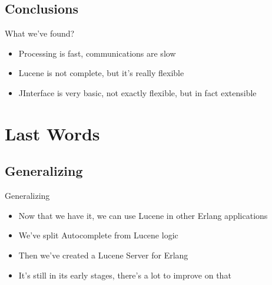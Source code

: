 \documentclass[utf8,hyperref={colorlinks=true}]{beamer}
\begin{document}
\subsection{Conclusions}
\begin{frame}{What we've found?}
	\begin{itemize}
		\item<+->Processing is fast, communications are slow
		\item<+->Lucene is not complete, but it's really flexible
		\item<+->JInterface is very basic, not exactly flexible, but in fact extensible
	\end{itemize}
\end{frame}

\section{Last Words}
\subsection{Generalizing}
\begin{frame}{Generalizing}
	\begin{itemize}
		\item<+->Now that we have it, we can use Lucene in other Erlang applications
		\item<+->We've split Autocomplete from Lucene logic
		\item<+->Then we've created a Lucene Server for Erlang
		\item<+->It's still in its early stages, there's a lot to improve on that
	\end{itemize}
\end{frame}
\end{document}
